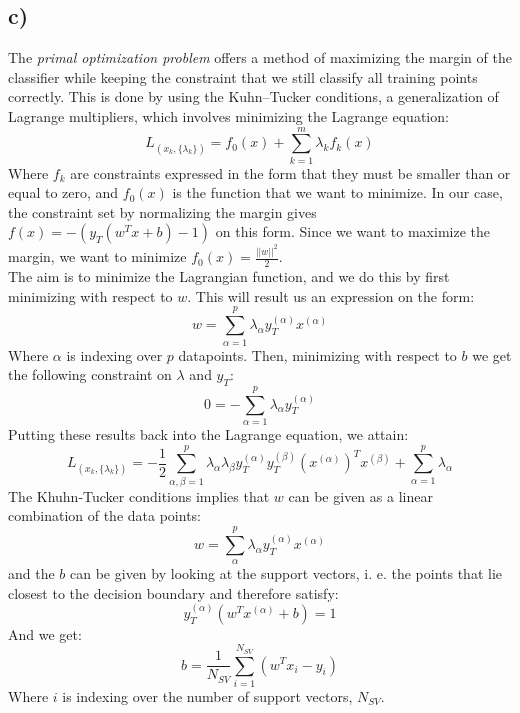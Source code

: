 \documentclass[11pt,a4paper]{article}
\begin{document}
\subsection*{c)}
The \textit{primal optimization problem} offers a method of maximizing the margin of the classifier while keeping the constraint that we still classify all training points correctly. This is done by using the Kuhn–Tucker conditions, a generalization of Lagrange multipliers, which involves minimizing the Lagrange equation:
\begin{equation}
  L_{(x_k, \{\lambda_k\})} = f_0(x) + \sum_{k=1}^m \lambda_k f_k(x)
\end{equation}
Where $f_k$ are constraints expressed in the form that they must be smaller than or equal to zero, and $f_0(x)$ is the function that we want to minimize. In our case, the constraint set by normalizing the margin gives $f(x) = -(y_T(w^Tx + b) -1)$ on this form. Since we want to maximize the margin, we want to minimize $f_0(x) = \frac{||w||^2}{2}$.\\
The aim is to minimize the Lagrangian function, and we do this by first minimizing with respect to $w$. This will result us an expression on the form:
\begin{equation}
w = \sum_{\alpha=1}^p \lambda_\alpha y_T^{(\alpha)}x^{(\alpha)}
\end{equation}
Where $\alpha$ is indexing over $p$ datapoints. Then, minimizing with respect to $b$ we get the following constraint on $\lambda$ and $y_T$:
\begin{equation}
0 = - \sum_{\alpha=1}^p \lambda_\alpha y_T^{(\alpha)}
\end{equation}
Putting these results back into the Lagrange equation, we attain:
\begin{equation}
L_{(x_k, \{\lambda_k\})} = -\frac{1}{2} \sum _{\alpha, \beta=1}^p\lambda_\alpha \lambda_\beta y_T^{(\alpha)}y_T^{(\beta)}(x^{(\alpha)})^Tx^{(\beta)}+\sum_{\alpha=1}^p\lambda_\alpha
\end{equation}
The Khuhn-Tucker conditions implies that $w$ can be given as a linear combination of the data points:
\begin{equation}
w = \sum_{\alpha}^p\lambda_\alpha y_T^{(\alpha)}x^{(\alpha)}
\end{equation}
and the $b$ can be given by looking at the support vectors, i. e. the points that lie closest to the decision boundary and therefore satisfy:
\begin{equation}
y_T^{(\alpha)}(w^Tx^{(\alpha)}+b) = 1
\end{equation}
And we get:
\begin{equation}
b = \frac{1}{N_{SV}}\sum_{i = 1} ^{N_{SV}}(w^Tx_i - y_i)
\end{equation}
Where $i$ is indexing over the number of support vectors, $N_{SV}$.
\end{document}
